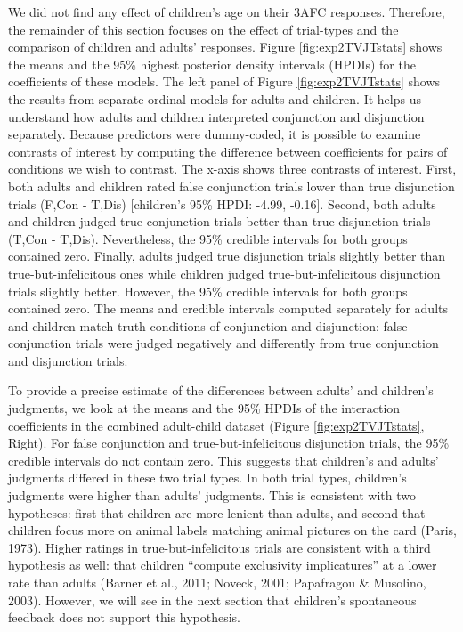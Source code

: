 \documentclass[,man,floatsintext]{apa6}
\begin{document}
We did not find any effect of children's age on their 3AFC responses. Therefore, the remainder of this section focuses on the effect of trial-types and the comparison of children and adults' responses. Figure \ref{fig:exp2TVJTstats} shows the means and the 95\% highest posterior density intervals (HPDIs) for the coefficients of these models. The left panel of Figure \ref{fig:exp2TVJTstats} shows the results from separate ordinal models for adults and children. It helps us understand how adults and children interpreted conjunction and disjunction separately. Because predictors were dummy-coded, it is possible to examine contrasts of interest by computing the difference between coefficients for pairs of conditions we wish to contrast. The x-axis shows three contrasts of interest. First, both adults and children rated false conjunction trials lower than true disjunction trials (F,Con - T,Dis) {[}children's 95\% HPDI: -4.99,
-0.16{]}. Second, both adults and children judged true conjunction trials better than true disjunction trials (T,Con - T,Dis). Nevertheless, the 95\% credible intervals for both groups contained zero. Finally, adults judged true disjunction trials slightly better than true-but-infelicitous ones while children judged true-but-infelicitous disjunction trials slightly better. However, the 95\% credible intervals for both groups contained zero. The means and credible intervals computed separately for adults and children match truth conditions of conjunction and disjunction: false conjunction trials were judged negatively and differently from true conjunction and disjunction trials.

To provide a precise estimate of the differences between adults' and children's judgments, we look at the means and the 95\% HPDIs of the interaction coefficients in the combined adult-child dataset (Figure \ref{fig:exp2TVJTstats}, Right). For false conjunction and true-but-infelicitous disjunction trials, the 95\% credible intervals do not contain zero. This suggests that children's and adults' judgments differed in these two trial types. In both trial types, children's judgments were higher than adults' judgments. This is consistent with two hypotheses: first that children are more lenient than adults, and second that children focus more on animal labels matching animal pictures on the card (Paris, 1973). Higher ratings in true-but-infelicitous trials are consistent with a third hypothesis as well: that children \enquote{compute exclusivity implicatures} at a lower rate than adults (Barner et al., 2011; Noveck, 2001; Papafragou \& Musolino, 2003). However, we will see in the next section that children's spontaneous feedback does not support this hypothesis.
\end{document}
